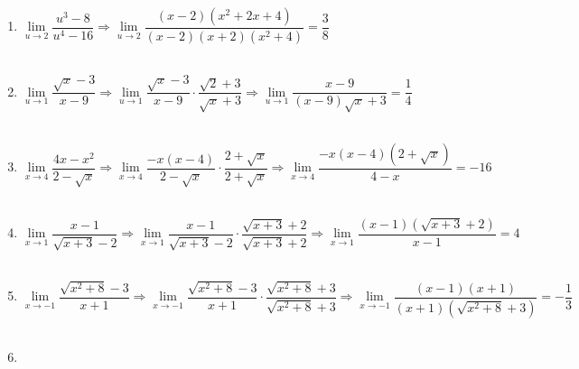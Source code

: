 \begin{enumerate}
\item $\lim\limits_{u\to 2} \dfrac{u^3-8}{u^4-16} \Longrightarrow \lim\limits_{u\to 2} \dfrac{(x-2)(x^2+2x+4)}{(x-2)(x+2)(x^2+4)} = \dfrac{3}{8}$\\\\

\item $\lim\limits_{u\to 1} \dfrac{\sqrt{x}-3}{x-9} \Longrightarrow \lim\limits_{u\to 1}\dfrac{\sqrt{x}-3}{x-9}\cdot \dfrac{\sqrt{2}+3}{\sqrt{x}+3} \Longrightarrow \lim\limits_{u\to 1}\dfrac{x-9}{(x-9)\sqrt{x}+3} = \dfrac{1}{4}$\\\\

\item $\lim\limits_{x\to 4}\dfrac{4x-x^2}{2-\sqrt{x}} \Longrightarrow \lim\limits_{x\to 4}\dfrac{-x(x-4)}{2-\sqrt{x}}\cdot \dfrac{2+\sqrt{x}}{2+\sqrt{x}} \Longrightarrow \lim\limits_{x\to 4} \dfrac{-x(x-4)(2+\sqrt{x})}{4-x} = -16$\\\\

\item $\lim\limits_{x\to 1} \dfrac{x-1}{\sqrt{x+3}-2} \Longrightarrow \lim\limits_{x\to 1} \dfrac{x-1}{\sqrt{x+3}-2} \cdot \dfrac{\sqrt{x+3}+2}{\sqrt{x+3}+2} \Longrightarrow \lim\limits_{x\to 1} \dfrac{(x-1)(\sqrt{x+3}+2)}{x-1} = 4 $\\\\

\item $\lim\limits_{x\to -1} \dfrac{\sqrt{x^2+8}-3}{x+1} \Longrightarrow \lim\limits_{x\to -1} \dfrac{\sqrt{x^2+8}-3}{x+1} \cdot \dfrac{\sqrt{x^2+8}+3}{\sqrt{x^2+8}+3} \Longrightarrow \lim\limits_{x\to -1}\dfrac{(x - 1)(x+1)}{(x+1)(\sqrt{x^2+8}+3)} = -\dfrac{1}{3}$\\\\

\item 

\end{enumerate}
